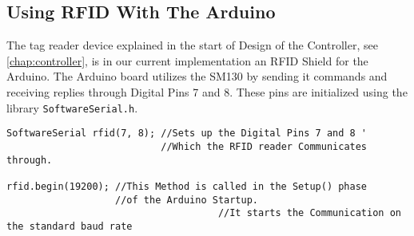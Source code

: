 \subsection{Using RFID With The Arduino}
\label{sec:rfidsect}
The tag reader device explained in the start of Design of the Controller, see \vref{chap:controller}, is in our current implementation an RFID Shield for the Arduino.
The Arduino board utilizes the SM130 by sending it commands and receiving replies through Digital Pins 7 and 8.
These pins are initialized using the library \verb|SoftwareSerial.h|.\\
\begin{lstlisting}
SoftwareSerial rfid(7, 8); //Sets up the Digital Pins 7 and 8 '
                           //Which the RFID reader Communicates through.
													
rfid.begin(19200); //This Method is called in the Setup() phase 
                   //of the Arduino Startup.
									 //It starts the Communication on the standard baud rate
\end{lstlisting}

